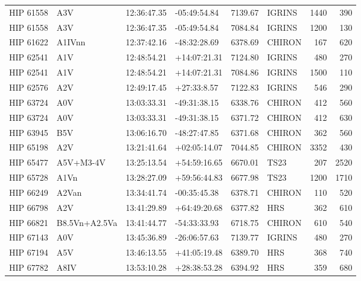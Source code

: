 \documentclass{emulateapj}
\begin{document}
\begin{longtable*}{|l|lllrlrr|}
   HIP 61558 &            A3V &    12:36:47.35 &   -05:49:54.84 &  7139.67 &     IGRINS &     1440 &     390 \\
   HIP 61558 &            A3V &    12:36:47.35 &   -05:49:54.84 &  7084.84 &     IGRINS &     1200 &     130 \\
   HIP 61622 &         A1IVnn &    12:37:42.16 &   -48:32:28.69 &  6378.69 &     CHIRON &      167 &     620 \\
   HIP 62541 &            A1V &    12:48:54.21 &   +14:07:21.31 &  7124.80 &     IGRINS &      480 &     270 \\
   HIP 62541 &            A1V &    12:48:54.21 &   +14:07:21.31 &  7084.86 &     IGRINS &     1500 &     110 \\
   HIP 62576 &            A2V &    12:49:17.45 &    +27:33:8.57 &  7122.83 &     IGRINS &      546 &     290 \\
   HIP 63724 &            A0V &    13:03:33.31 &   -49:31:38.15 &  6338.76 &     CHIRON &      412 &     560 \\
   HIP 63724 &            A0V &    13:03:33.31 &   -49:31:38.15 &  6371.72 &     CHIRON &      412 &     630 \\
   HIP 63945 &            B5V &    13:06:16.70 &   -48:27:47.85 &  6371.68 &     CHIRON &      362 &     560 \\
   HIP 65198 &            A2V &    13:21:41.64 &   +02:05:14.07 &  7044.85 &     CHIRON &     3352 &     430 \\
   HIP 65477 &      A5V+M3-4V &    13:25:13.54 &   +54:59:16.65 &  6670.01 &       TS23 &      207 &    2520 \\
   HIP 65728 &           A1Vn &    13:28:27.09 &   +59:56:44.83 &  6677.98 &       TS23 &     1200 &    1710 \\
   HIP 66249 &          A2Van &    13:34:41.74 &   -00:35:45.38 &  6378.71 &     CHIRON &      110 &     520 \\
   HIP 66798 &            A2V &    13:41:29.89 &   +64:49:20.68 &  6377.82 &        HRS &      362 &     610 \\
   HIP 66821 &  B8.5Vn+A2.5Va &    13:41:44.77 &   -54:33:33.93 &  6718.75 &     CHIRON &      610 &     540 \\
   HIP 67143 &            A0V &    13:45:36.89 &   -26:06:57.63 &  7139.77 &     IGRINS &      480 &     270 \\
   HIP 67194 &            A5V &    13:46:13.55 &   +41:05:19.48 &  6389.70 &        HRS &      368 &     740 \\
   HIP 67782 &           A8IV &    13:53:10.28 &   +28:38:53.28 &  6394.92 &        HRS &      359 &     680 \\

\end{longtable*}
\end{document}
